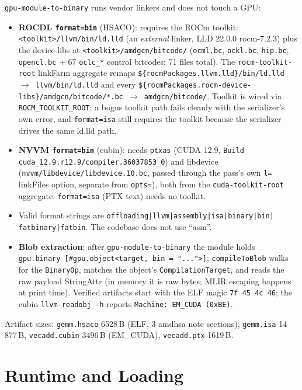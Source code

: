 \documentclass[10pt,twoside]{article}
\begin{document}
\texttt{gpu-module-to-binary} runs vendor linkers and does not touch a GPU:
\begin{itemize}
  \item \textbf{ROCDL \texttt{format=bin}} (HSACO): requires the ROCm toolkit:
        \texttt{<toolkit>/llvm/bin/ld.lld} (an \emph{external} linker, LLD 22.0.0
        rocm-7.2.3) plus the device-libs at \texttt{<toolkit>/amdgcn/bitcode/}
        (\texttt{ocml.bc}, \texttt{ockl.bc}, \texttt{hip.bc}, \texttt{opencl.bc} + 67
        \texttt{oclc\_*} control bitcodes; 71 files total). The \texttt{rocm-toolkit-root}
        linkFarm aggregate remaps
        \texttt{\$\{rocmPackages.llvm.lld\}/bin/ld.lld $\to$ llvm/bin/ld.lld} and every
        \texttt{\$\{rocmPackages.rocm-device-libs\}/amdgcn/bitcode/*.bc $\to$ amdgcn/bitcode/}.
        Toolkit is wired via \texttt{ROCM\_TOOLKIT\_ROOT}; a bogus toolkit path fails cleanly
        with the serializer's own error, and \texttt{format=isa} still requires the toolkit
        because the serializer drives the same ld.lld path.
  \item \textbf{NVVM \texttt{format=bin}} (cubin): needs \texttt{ptxas} (CUDA 12.9,
        \texttt{Build cuda\_12.9.r12.9/compiler.36037853\_0}) and libdevice
        (\texttt{nvvm/libdevice/libdevice.10.bc}, passed through the pass's own \texttt{l=}
        linkFiles option, separate from \texttt{opts=}), both from the
        \texttt{cuda-toolkit-root} aggregate. \texttt{format=isa} (PTX text) needs no toolkit.
  \item Valid format strings are \texttt{offloading|llvm|assembly|isa|binary|bin|
        fatbinary|fatbin}. The codebase does not use ``asm''.
  \item \textbf{Blob extraction}: after \texttt{gpu-module-to-binary} the module holds
        \texttt{gpu.binary [\#gpu.object<target, bin = "...">]}; \texttt{compileToBlob} walks
        for the \texttt{BinaryOp}, matches the object's \texttt{CompilationTarget}, and reads
        the raw payload StringAttr (in memory it is raw bytes; MLIR escaping happens at print
        time). Verified artifacts start with the ELF magic \texttt{7f 45 4c 46}; the cubin
        \texttt{llvm-readobj -h} reports \texttt{Machine: EM\_CUDA (0xBE)}.
\end{itemize}

Artifact sizes: \texttt{gemm.hsaco} 6528\,B (ELF, 3 amdhsa note sections),
\texttt{gemm.isa} 14\,877\,B, \texttt{vecadd.cubin} 3496\,B (EM\_CUDA),
\texttt{vecadd.ptx} 1619\,B.

\section{Runtime and Loading}
\label{sec:runtime}
\end{document}
